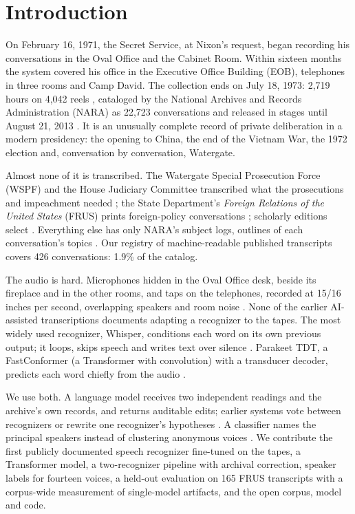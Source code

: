 \section{Introduction}
\label{sec:intro}

On February 16, 1971, the Secret Service, at Nixon's request, began recording his conversations in the Oval Office and the Cabinet Room. Within sixteen months the system covered his office in the Executive Office Building (EOB), telephones in three rooms and Camp David. The collection ends on July 18, 1973: 2,719 hours on 4,042 reels \citep{nixonlib2019findingaid}, cataloged by the National Archives and Records Administration (NARA) as 22,723 conversations \citep{nara2024conversations} and released in stages until August 21, 2013 \citep{nixonlib2019findingaid}. It is an unusually complete record of private deliberation in a modern presidency: the opening to China, the end of the Vietnam War, the 1972 election and, conversation by conversation, Watergate.

Almost none of it is transcribed. The Watergate Special Prosecution Force (WSPF) and the House Judiciary Committee transcribed what the prosecutions and impeachment needed \citep{wspf,hjc1974eight}; the State Department's \textit{Foreign Relations of the United States} (FRUS) prints foreign-policy conversations \citep{frus1969}; scholarly editions select \citep{kutler1997abuse,brinkley2014nixontapes,brinkley2015nixontapes1973,prde2014nixon,dean2014defense}. Everything else has only NARA's subject logs, outlines of each conversation's topics \citep{nixonlib2010subjectlogs}. Our registry of machine-readable published transcripts covers 426 conversations: 1.9\% of the catalog.

The audio is hard. Microphones hidden in the Oval Office desk, beside its fireplace and in the other rooms, and taps on the telephones, recorded at 15/16 inches per second, overlapping speakers and room noise \citep{nixonlib2019findingaid}. None of the earlier AI-assisted transcriptions \citep{fine2026easynixon,hoover2026nixon,ferguson2026unlocked} documents adapting a recognizer to the tapes. The most widely used recognizer, Whisper, conditions each word on its own previous output; it loops, skips speech and writes text over silence \citep{radford2023whisper,koenecke2024careless,baranski2025hallucination,bain2023whisperx}. Parakeet TDT, a FastConformer (a Transformer with convolution) with a transducer decoder, predicts each word chiefly from the audio \citep{xu2023tdt,nvidia2025parakeetv3}.

We use both. A language model receives two independent readings and the archive's own records, and returns auditable edits; earlier systems vote between recognizers \citep{fiscus1997rover} or rewrite one recognizer's hypotheses \citep{chen2023hyporadise}. A classifier names the principal speakers instead of clustering anonymous voices \citep{bredin2023pyannote}. We contribute the first publicly documented speech recognizer fine-tuned on the tapes, a Transformer model, a two-recognizer pipeline with archival correction, speaker labels for fourteen voices, a held-out evaluation on 165 FRUS transcripts with a corpus-wide measurement of single-model artifacts, and the open corpus, model and code.
